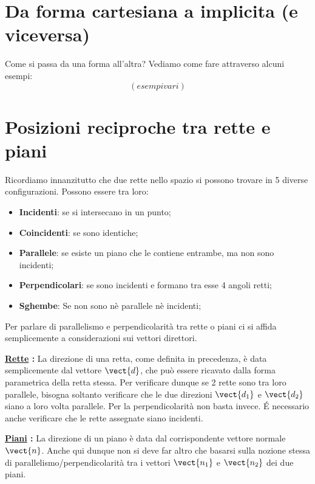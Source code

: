 \section{Da forma cartesiana a implicita (e viceversa)}
Come si passa da una forma all'altra? Vediamo come fare attraverso alcuni esempi:
\[(esempi vari)\]

\section{Posizioni reciproche tra rette e piani}

Ricordiamo innanzitutto che due rette nello spazio si possono trovare in 5 diverse configurazioni. Possono essere tra loro:
\begin{itemize}
\item \textbf{Incidenti}: se si intersecano in un punto;
\item \textbf{Coincidenti}: se sono identiche;
\item \textbf{Parallele}: se esiste un piano che le contiene entrambe, ma non sono incidenti;
\item \textbf{Perpendicolari}: se sono incidenti e formano tra esse 4 angoli retti;
\item \textbf{Sghembe}: Se non sono nè parallele nè incidenti;
\end{itemize}

\vspace{7pt}

Per parlare di parallelismo e perpendicolarità tra rette o piani ci si affida semplicemente a considerazioni sui vettori direttori. 

\vspace{7pt}

\textbf{\underline{Rette} :} \;La direzione di una retta, come definita in precedenza, è data semplicemente dal vettore $\vect{d}$, che può essere ricavato dalla forma parametrica della retta stessa. Per verificare dunque se 2 rette sono tra loro parallele, bisogna soltanto verificare che le due direzioni $\vect{d_1}$ e $\vect{d_2}$ siano a loro volta parallele. Per la perpendicolarità non basta invece. \'E necessario anche verificare che le rette assegnate siano incidenti.

\vspace{7pt}

\textbf{\underline{Piani} :} \; La direzione di un piano è data dal corrispondente vettore normale $\vect{n}$. Anche qui dunque non si deve far altro che basarsi sulla nozione stessa di parallelismo/perpendicolarità tra i vettori $\vect{n_1}$ e $\vect{n_2}$ dei due piani.